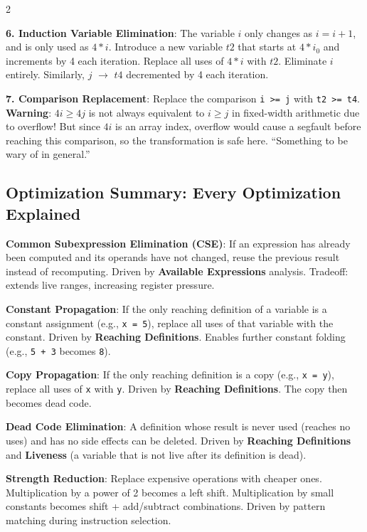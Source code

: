 \documentclass[9pt,landscape]{extarticle}
\begin{document}
\begin{multicols}{2}
\begin{exambox}
\textbf{6. Induction Variable Elimination}: The variable $i$ only changes as $i = i + 1$, and is only used as $4 * i$. Introduce a new variable $t2$ that starts at $4 * i_0$ and increments by 4 each iteration. Replace all uses of $4 * i$ with $t2$. Eliminate $i$ entirely. Similarly, $j$ $\to$ $t4$ decremented by 4 each iteration.

\textbf{7. Comparison Replacement}: Replace the comparison \texttt{i >= j} with \texttt{t2 >= t4}. \textbf{Warning}: $4i \geq 4j$ is not always equivalent to $i \geq j$ in fixed-width arithmetic due to overflow! But since $4i$ is an array index, overflow would cause a segfault before reaching this comparison, so the transformation is safe here. ``Something to be wary of in general.''
\end{exambox}

\subsection{Optimization Summary: Every Optimization Explained}

\textbf{Common Subexpression Elimination (CSE)}: If an expression has already been computed and its operands have not changed, reuse the previous result instead of recomputing. Driven by \textbf{Available Expressions} analysis. Tradeoff: extends live ranges, increasing register pressure.

\textbf{Constant Propagation}: If the only reaching definition of a variable is a constant assignment (e.g., \texttt{x = 5}), replace all uses of that variable with the constant. Driven by \textbf{Reaching Definitions}. Enables further constant folding (e.g., \texttt{5 + 3} becomes \texttt{8}).

\textbf{Copy Propagation}: If the only reaching definition is a copy (e.g., \texttt{x = y}), replace all uses of \texttt{x} with \texttt{y}. Driven by \textbf{Reaching Definitions}. The copy then becomes dead code.

\textbf{Dead Code Elimination}: A definition whose result is never used (reaches no uses) and has no side effects can be deleted. Driven by \textbf{Reaching Definitions} and \textbf{Liveness} (a variable that is not live after its definition is dead).

\textbf{Strength Reduction}: Replace expensive operations with cheaper ones. Multiplication by a power of 2 becomes a left shift. Multiplication by small constants becomes shift + add/subtract combinations. Driven by pattern matching during instruction selection.


\end{multicols}
\end{document}

